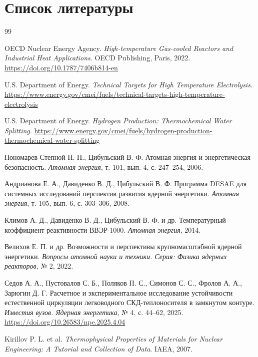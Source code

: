 \documentclass[12pt]{article}
\begin{document}
\section{Список литературы}
\begin{thebibliography}{99}

OECD Nuclear Energy Agency.
\textit{High-temperature Gas-cooled Reactors and Industrial Heat Applications}.
OECD Publishing, Paris, 2022.
\url{https://doi.org/10.1787/7406b814-en}

U.S. Department of Energy.
\textit{Technical Targets for High Temperature Electrolysis}.
\url{https://www.energy.gov/cmei/fuels/technical-targets-high-temperature-electrolysis}

U.S. Department of Energy.
\textit{Hydrogen Production: Thermochemical Water Splitting}.
\url{https://www.energy.gov/cmei/fuels/hydrogen-production-thermochemical-water-splitting}

Пономарев-Степной Н. Н., Цибульский В. Ф.
Атомная энергия и энергетическая безопасность.
\textit{Атомная энергия}, т. 101, вып. 4, с. 247--254, 2006.

Андрианова Е. А., Давиденко В. Д., Цибульский В. Ф.
Программа DESAE для системных исследований перспектив развития ядерной энергетики.
\textit{Атомная энергия}, т. 105, вып. 6, с. 303--306, 2008.

Климов А. Д., Давиденко В. Д., Цибульский В. Ф. и др.
Температурный коэффициент реактивности ВВЭР-1000.
\textit{Атомная энергия}, 2014.

Велихов Е. П. и др.
Возможности и перспективы крупномасштабной ядерной энергетики.
\textit{Вопросы атомной науки и техники. Серия: Физика ядерных реакторов}, № 2, 2022.

Седов А. А., Пустовалов С. Б., Поляков П. С., Симонов С. С., Фролов А. А., Зарюгин Д. Г.
Расчетное и экспериментальное исследование устойчивости естественной циркуляции легководного СКД-теплоносителя в замкнутом контуре.
\textit{Известия вузов. Ядерная энергетика}, № 4, с. 44--62, 2025.
\url{https://doi.org/10.26583/npe.2025.4.04}

Kirillov P. L. et al.
\textit{Thermophysical Properties of Materials for Nuclear Engineering: A Tutorial and Collection of Data}.
IAEA, 2007.


\end{thebibliography}
\end{document}
